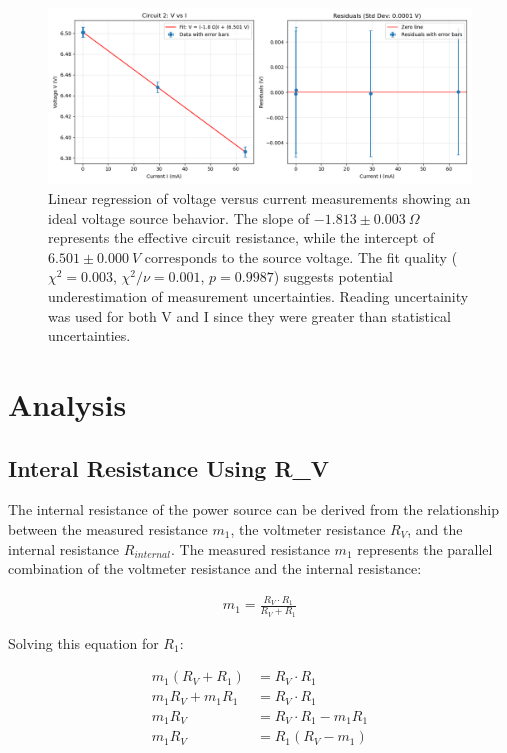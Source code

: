 \documentclass{article} %
\begin{document}
\begin{figure}[htbp]
  \centering
  \includegraphics[width=1\linewidth]{Figs/Circuit_2.png}
    \caption{Linear regression of voltage versus current measurements showing an ideal voltage source behavior. 
                The slope of $-1.813 \pm 0.003~\Omega$ represents the effective circuit resistance, while the intercept of $6.501 \pm 0.000~V$ corresponds to the source voltage. 
                The fit quality ($\chi^2 = 0.003$, $\chi^2/\nu = 0.001$, $p = 0.9987$) suggests potential underestimation of measurement uncertainties.
                Reading uncertainity was used for both V and I since they were greater than statistical uncertainties.}
    \label{fig:circuit_2_fit}
\end{figure}

\section{Analysis}

\subsection{Interal Resistance Using R\_V}

The internal resistance of the power source can be derived from the relationship between the measured resistance $m_1$, the voltmeter resistance $R_V$, and the internal resistance $R_{internal}$. 
The measured resistance $m_1$ represents the parallel combination of the voltmeter resistance and the internal resistance:

\begin{align*}
m_1 = \frac{R_V \cdot R_{1}}{R_V + R_{1}}
\end{align*}

Solving this equation for $R_{1}$:

\begin{align*}
m_1 (R_V + R_{1}) &= R_V \cdot R_{1} \\
m_1 R_V + m_1 R_{1} &= R_V \cdot R_{1} \\
m_1 R_V &= R_V \cdot R_{1} - m_1 R_{1} \\
m_1 R_V &= R_{1} (R_V - m_1)
\end{align*}
\end{document}
